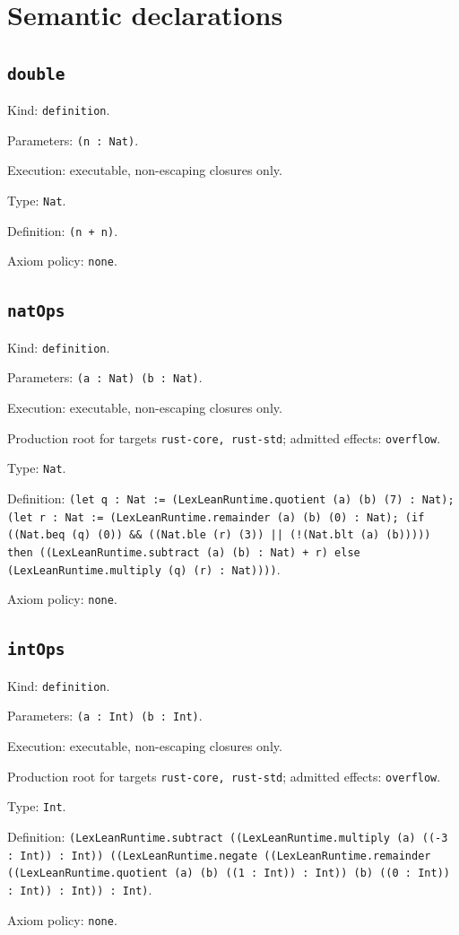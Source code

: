 \documentclass[11pt]{article}
\begin{document}
\section*{Semantic declarations}
\subsection*{\texttt{double}}
\noindent Kind: \texttt{definition}.\par
\noindent Parameters: \texttt{(n : Nat)}.\par
\noindent Execution: executable, non-escaping closures only.\par
\noindent Type: \texttt{Nat}.\par
\noindent Definition: \texttt{(n + n)}.\par
\noindent Axiom policy: \texttt{none}.\par
\subsection*{\texttt{natOps}}
\noindent Kind: \texttt{definition}.\par
\noindent Parameters: \texttt{(a : Nat) (b : Nat)}.\par
\noindent Execution: executable, non-escaping closures only.\par
\noindent Production root for targets \texttt{rust-core, rust-std}; admitted effects: \texttt{overflow}.\par
\noindent Type: \texttt{Nat}.\par
\noindent Definition: \texttt{(let q : Nat := (LexLeanRuntime.quotient (a) (b) (7) : Nat); (let r : Nat := (LexLeanRuntime.remainder (a) (b) (0) : Nat); (if ((Nat.beq (q) (0)) \&\& ((Nat.ble (r) (3)) || (!(Nat.blt (a) (b))))) then ((LexLeanRuntime.subtract (a) (b) : Nat) + r) else (LexLeanRuntime.multiply (q) (r) : Nat))))}.\par
\noindent Axiom policy: \texttt{none}.\par
\subsection*{\texttt{intOps}}
\noindent Kind: \texttt{definition}.\par
\noindent Parameters: \texttt{(a : Int) (b : Int)}.\par
\noindent Execution: executable, non-escaping closures only.\par
\noindent Production root for targets \texttt{rust-core, rust-std}; admitted effects: \texttt{overflow}.\par
\noindent Type: \texttt{Int}.\par
\noindent Definition: \texttt{(LexLeanRuntime.subtract ((LexLeanRuntime.multiply (a) ((-3 : Int)) : Int)) ((LexLeanRuntime.negate ((LexLeanRuntime.remainder ((LexLeanRuntime.quotient (a) (b) ((1 : Int)) : Int)) (b) ((0 : Int)) : Int)) : Int)) : Int)}.\par
\noindent Axiom policy: \texttt{none}.\par
\end{document}
